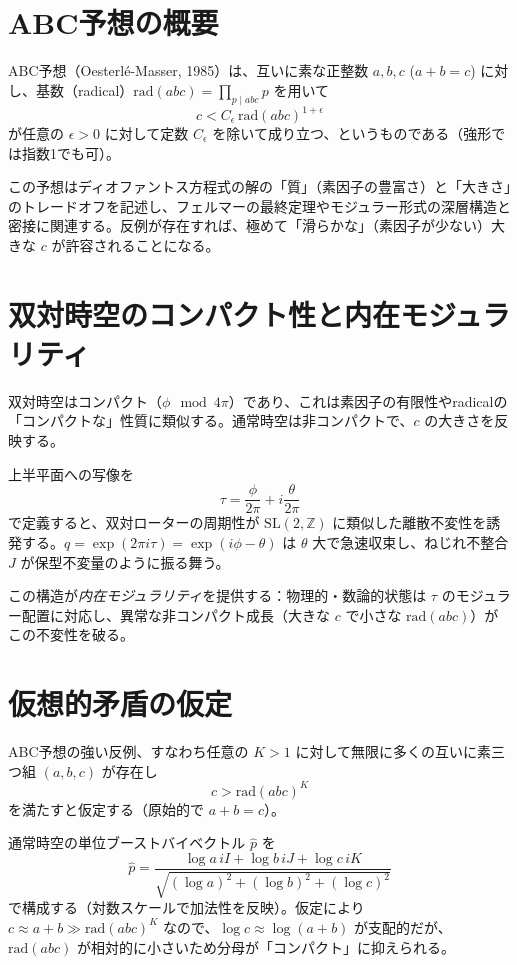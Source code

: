 \documentclass[dvipdfmx,a4paper]{article}
\begin{document}
\section{ABC予想の概要}

ABC予想（Oesterlé-Masser, 1985）は、互いに素な正整数 $a, b, c$ ($a + b = c$) に対し、基数（radical）$\mathrm{rad}(abc) = \prod_{p \mid abc} p$ を用いて
\[
c < C_\epsilon \, \mathrm{rad}(abc)^{1+\epsilon}
\]
が任意の $\epsilon > 0$ に対して定数 $C_\epsilon$ を除いて成り立つ、というものである（強形では指数1でも可）。

この予想はディオファントス方程式の解の「質」（素因子の豊富さ）と「大きさ」のトレードオフを記述し、フェルマーの最終定理やモジュラー形式の深層構造と密接に関連する。反例が存在すれば、極めて「滑らかな」（素因子が少ない）大きな $c$ が許容されることになる。

\section{双対時空のコンパクト性と内在モジュラリティ}

双対時空はコンパクト（$\phi \mod 4\pi$）であり、これは素因子の有限性やradicalの「コンパクトな」性質に類似する。通常時空は非コンパクトで、$c$ の大きさを反映する。

上半平面への写像を
\[
\tau = \frac{\phi}{2\pi} + i \frac{\theta}{2\pi}
\]
で定義すると、双対ローターの周期性が $\mathrm{SL}(2,\mathbb{Z})$ に類似した離散不変性を誘発する。$q = \exp(2\pi i \tau) = \exp(i \phi - \theta)$ は $\theta$ 大で急速収束し、ねじれ不整合 $J$ が保型不変量のように振る舞う。

この構造が\emph{内在モジュラリティ}を提供する：物理的・数論的状態は $\tau$ のモジュラー配置に対応し、異常な非コンパクト成長（大きな $c$ で小さな $\mathrm{rad}(abc)$）がこの不変性を破る。

\section{仮想的矛盾の仮定}

ABC予想の強い反例、すなわち任意の $K > 1$ に対して無限に多くの互いに素三つ組 $(a,b,c)$ が存在し
\[
c > \mathrm{rad}(abc)^K
\]
を満たすと仮定する（原始的で $a + b = c$）。

通常時空の単位ブーストバイベクトル $\hat{p}$ を
\[
\hat{p} = \frac{\log a \, iI + \log b \, iJ + \log c \, iK}{\sqrt{(\log a)^2 + (\log b)^2 + (\log c)^2}}
\]
で構成する（対数スケールで加法性を反映）。仮定により $c \approx a + b \gg \mathrm{rad}(abc)^K$ なので、$\log c \approx \log(a+b)$ が支配的だが、$\mathrm{rad}(abc)$ が相対的に小さいため分母が「コンパクト」に抑えられる。
\end{document}
